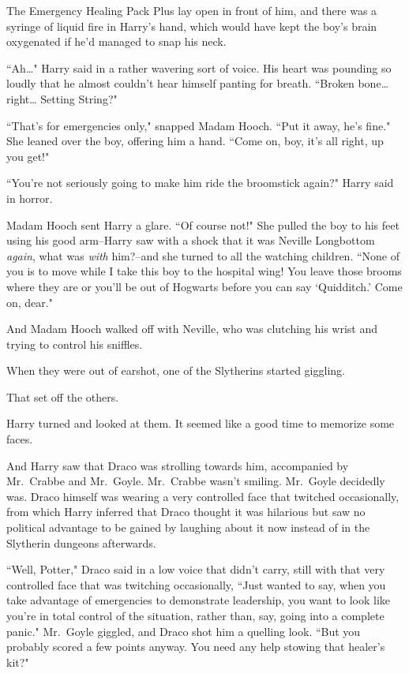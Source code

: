 The Emergency Healing Pack Plus lay open in front of him, and there was a syringe of liquid fire in Harry's hand, which would have kept the boy's brain oxygenated if he'd managed to snap his neck.

``Ah{\ldots}" Harry said in a rather wavering sort of voice. His heart was pounding so loudly that he almost couldn't hear himself panting for breath. ``Broken bone{\ldots} right{\ldots} Setting String?"

``That's for emergencies only," snapped Madam Hooch. ``Put it away, he's fine." She leaned over the boy, offering him a hand. ``Come on, boy, it's all right, up you get!"

``You're not seriously going to make him ride the broomstick again?" Harry said in horror.

Madam Hooch sent Harry a glare. ``Of course not!" She pulled the boy to his feet using his good arm\---Harry saw with a shock that it was Neville Longbottom \emph{again}, what was \emph{with} him?\---and she turned to all the watching children. ``None of you is to move while I take this boy to the hospital wing! You leave those brooms where they are or you'll be out of Hogwarts before you can say `Quidditch.' Come on, dear."

And Madam Hooch walked off with Neville, who was clutching his wrist and trying to control his sniffles.

When they were out of earshot, one of the Slytherins started giggling.

That set off the others.

Harry turned and looked at them. It seemed like a good time to memorize some faces.

And Harry saw that Draco was strolling towards him, accompanied by Mr.~Crabbe and Mr.~Goyle. Mr.~Crabbe wasn't smiling. Mr.~Goyle decidedly was. Draco himself was wearing a very controlled face that twitched occasionally, from which Harry inferred that Draco thought it was hilarious but saw no political advantage to be gained by laughing about it now instead of in the Slytherin dungeons afterwards.

``Well, Potter," Draco said in a low voice that didn't carry, still with that very controlled face that was twitching occasionally, ``Just wanted to say, when you take advantage of emergencies to demonstrate leadership, you want to look like you're in total control of the situation, rather than, say, going into a complete panic." Mr.~Goyle giggled, and Draco shot him a quelling look. ``But you probably scored a few points anyway. You need any help stowing that healer's kit?"

